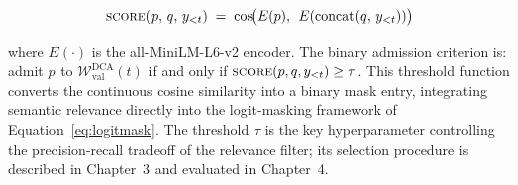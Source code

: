 \begin{equation}
    \textsc{score}(p,\, q,\, y_{<t}) \;=\;
    \cos\!\bigl(E(p),\;\, E(\text{concat}(q,\, y_{<t}))\bigr)
    \label{eq:score}
\end{equation}

where $E(\cdot)$ is the all-MiniLM-L6-v2 encoder. The binary admission
criterion is: admit $p$ to $\mathcal{W}_{\text{val}}^{\text{DCA}}(t)$ if and
only if $\textsc{score}(p, q, y_{<t}) \geq \tau$. This threshold function
converts the continuous cosine similarity into a binary mask entry, integrating
semantic relevance directly into the logit-masking framework of
Equation~\eqref{eq:logitmask}. The threshold $\tau$ is the key hyperparameter
controlling the precision-recall tradeoff of the relevance filter; its selection
procedure is described in Chapter~3 and evaluated in Chapter~4.

